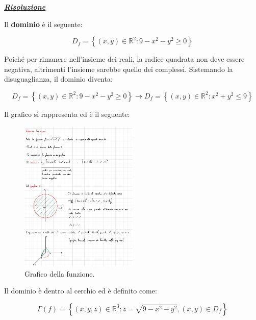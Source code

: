 \documentclass[a4paper]{article}
\begin{document}
	\noindent
	\textcolor{Green4}{\textbf{\emph{\underline{Risoluzione}}}}\newline
	
	\noindent
	Il \textbf{dominio} è il seguente:
	
	\begin{equation*}
		D_{f} = \left\{\left(x,y\right) \in \mathbb{R}^{2} : 9 - x^{2} - y^{2} \ge 0\right\}
	\end{equation*}

	\noindent
	Poiché per rimanere nell'insieme dei reali, la radice quadrata non deve essere negativa, altrimenti l'insieme sarebbe quello dei complessi. Sistemando la disuguaglianza, il dominio diventa:

	\begin{equation*}
		D_{f} = \left\{\left(x,y\right) \in \mathbb{R}^{2} : 9 - x^{2} - y^{2} \ge 0\right\} \longrightarrow
		D_{f} = \left\{\left(x,y\right) \in \mathbb{R}^{2} : x^{2} + y^{2} \le 9\right\}
	\end{equation*}

	\noindent
	Il grafico si rappresenta ed è il seguente:
	
	\begin{figure}[!htp]
		\centering
		\includegraphics[width=0.5\textwidth]{img/grafico_esame1.pdf}
		\caption{Grafico della funzione.}
	\end{figure}

	\noindent
	Il dominio è dentro al cerchio ed è definito come:
	
	\begin{equation*}
		\Gamma\left(f\right) = \left\{\left(x,y,z\right) \in \mathbb{R}^{3} : z = \sqrt{9 - x^{2} - y^{2}}, \left(x,y\right) \in D_{f}\right\}
	\end{equation*}
\end{document}
